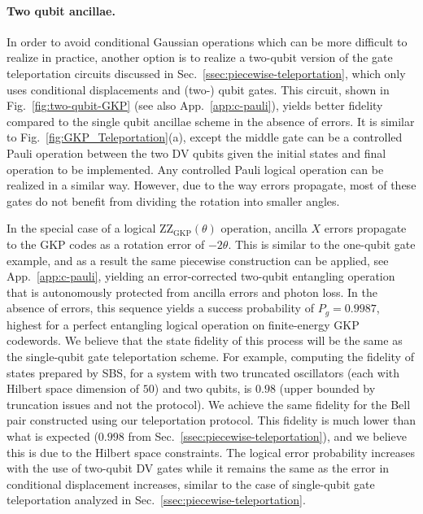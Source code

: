 \documentclass[aps,prx,showpacs,notitlepage,twocolumn,superscriptaddress,nofootinbib,preprintnumbers,floatfix,10pt, longbibliography]{revtex4-2}
\begin{document}
\paragraph{Two qubit ancillae.} In order to avoid conditional Gaussian operations which can be more difficult to realize in practice, another option is to realize a two-qubit version of the gate teleportation circuits discussed in Sec.~\ref{ssec:piecewise-teleportation}, which only uses conditional displacements and (two-) qubit gates.
This circuit, shown in Fig.~\ref{fig:two-qubit-GKP} (see also App.~\ref{app:c-pauli}), yields better fidelity compared to the single qubit ancillae scheme in the absence of errors. 
It is similar to Fig.~\ref{fig:GKP_Teleportation}(a), except the middle gate can be a controlled Pauli operation between the two DV qubits given the initial states and final operation to be implemented. Any controlled Pauli logical operation can be realized in a similar way. However, due to the way errors propagate, most of these gates do not benefit from dividing the rotation into smaller angles.

In the special case of a logical $\mathrm{ZZ}_\mathrm{GKP}(\theta)$ operation, ancilla $X$ errors propagate to the GKP codes as a rotation error of $-2\theta$. This is similar to the one-qubit gate example, and as a result the same piecewise construction can be applied, see App.~\ref{app:c-pauli}, yielding an error-corrected two-qubit entangling operation that is autonomously protected from ancilla errors and photon loss. In the absence of errors, this sequence yields a success probability of $P_g=0.9987$, highest for a perfect entangling logical operation on finite-energy GKP codewords. We believe that the state fidelity of this process will be the same as the single-qubit gate teleportation scheme. For example, computing the fidelity of states prepared by SBS, for a system with two truncated oscillators (each with Hilbert space dimension of $50$) and two qubits, is $0.98$ (upper bounded by truncation issues and not the protocol). We achieve the same fidelity for the Bell pair constructed using our teleportation protocol. This fidelity is much lower than what is expected ($0.998$ from Sec.~\ref{ssec:piecewise-teleportation}), and we believe this is due to the Hilbert space constraints. The logical error probability increases with the use of two-qubit DV gates while it remains the same as the error in conditional displacement increases, similar to the case of single-qubit gate teleportation analyzed in Sec.~\ref{ssec:piecewise-teleportation}.
\end{document}
